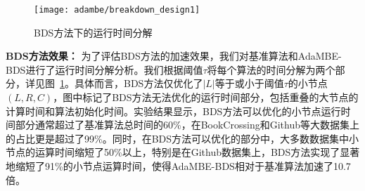 





\begin{figure} [t]
	\centering
	\texttt{[image: adambe/breakdown\_design1]}
	 
	\caption{BDS方法下的运行时间分解}
	\vspace{-0.1in}
	\label{fig:ada_breakdown_design1}
\end{figure}



\textbf{BDS方法效果：} 为了评估BDS方法的加速效果，我们对基准算法和AdaMBE-BDS进行了运行时间分解分析。我们根据阈值$\tau$将每个算法的时间分解为两个部分，详见图~\ref{fig:ada_breakdown_design1}。具体而言，BDS方法仅优化了$|L|$等于或小于阈值$\tau$的小节点$(L, R, C)$，图中标记了BDS方法无法优化的运行时间部分，包括重叠的大节点的计算时间和算法初始化时间。实验结果显示，BDS方法可以优化的小节点运行时间部分通常超过了基准算法总时间的60\%，在BookCrossing和Github等大数据集上的占比更是超过了99\%。同时，在BDS方法可以优化的部分中，大多数数据集中小节点的运算时间缩短了50\%以上，特别是在Github数据集上，BDS方法实现了显著地缩短了91\%的小节点运算时间，使得AdaMBE-BDS相对于基准算法加速了10.7倍。

